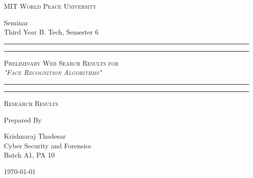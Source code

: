 \documentclass[11pt]{article}
\begin{document}
\begin{titlepage}
	\centering


	\huge\textsc{
		MIT World Peace University
	}\\

	\vspace{0.75\baselineskip} %

	\LARGE{
		Seminar\\
Third Year B. Tech, Semester 6
	}

	\vfill %


	\rule{\textwidth}{1.6pt}\vspace{-\baselineskip}\vspace{2pt}
	\rule{\textwidth}{0.6pt}
	\vspace{0.75\baselineskip} %



	\huge{\textsc{
Preliminary Web Search Results for \\
			\textit{"Face Recognition Algorithms"}
		}} \\



	\vspace{0.5\baselineskip} %
	\rule{\textwidth}{0.6pt}\vspace{-\baselineskip}\vspace{2.8pt}
	\rule{\textwidth}{1.6pt}

	\vspace{1\baselineskip} %


	\LARGE\textsc{
		Research Results
	} %
	\vfill


	Prepared By
	\vspace{0.5\baselineskip} %

	\Large{
		Krishnaraj Thadesar \\
		Cyber Security and Forensics\\
		Batch A1, PA 10
	}


	\vspace{0.5\baselineskip} %
	\today

\end{titlepage}
\end{document}
